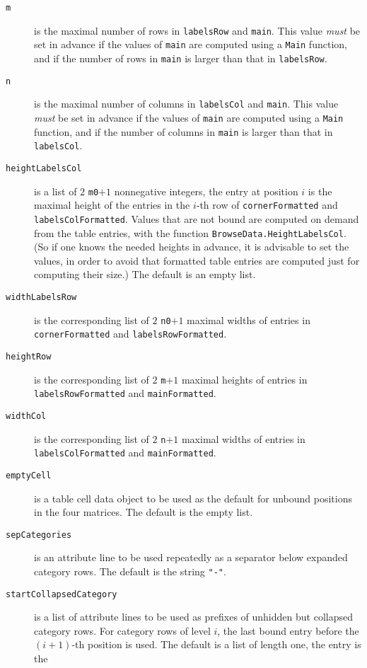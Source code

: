 \documentclass[a4paper,11pt]{report}
\begin{document}
{{{\begin{description}
\item[{\texttt{m}}]  is the maximal number of rows in \texttt{labelsRow} and \texttt{main}. This value \emph{must} be set in advance if the values of \texttt{main} are computed using a \texttt{Main} function, and if the number of rows in \texttt{main} is larger than that in \texttt{labelsRow}. 
\item[{\texttt{n}}]  is the maximal number of columns in \texttt{labelsCol} and \texttt{main}. This value \emph{must} be set in advance if the values of \texttt{main} are computed using a \texttt{Main} function, and if the number of columns in \texttt{main} is larger than that in \texttt{labelsCol}. 
\item[{\texttt{heightLabelsCol}}]  is a list of $2$ \texttt{m0}$ + 1$ nonnegative integers, the entry at position $i$ is the maximal height of the entries in the $i$-th row of \texttt{cornerFormatted} and \texttt{labelsColFormatted}. Values that are not bound are computed on demand from the table entries,
with the function \texttt{BrowseData.HeightLabelsCol}.  (So if one knows the needed heights in advance, it is advisable to set the
values, in order to avoid that formatted table entries are computed just for
computing their size.) The default is an empty list. 
\item[{\texttt{widthLabelsRow}}]  is the corresponding list of $2$ \texttt{n0}$ + 1$ maximal widths of entries in \texttt{cornerFormatted} and \texttt{labelsRowFormatted}. 
\item[{\texttt{heightRow}}]  is the corresponding list of $2$ \texttt{m}$ + 1$ maximal heights of entries in \texttt{labelsRowFormatted} and \texttt{mainFormatted}. 
\item[{\texttt{widthCol}}]  is the corresponding list of $2$ \texttt{n}$ + 1$ maximal widths of entries in \texttt{labelsColFormatted} and \texttt{mainFormatted}. 
\item[{\texttt{emptyCell}}]  is a table cell data object to be used as the default for unbound positions in
the four matrices. The default is the empty list. 
\item[{\texttt{sepCategories}}]  is an attribute line to be used repeatedly as a separator below expanded
category rows. The default is the string \texttt{"-"}. 
\item[{\texttt{startCollapsedCategory}}]  is a list of attribute lines to be used as prefixes of unhidden but collapsed
category rows. For category rows of level $i$, the last bound entry before the $(i+1)$-th position is used. The default is a list of length one, the entry is the

\end{description}}}}
\end{document}
